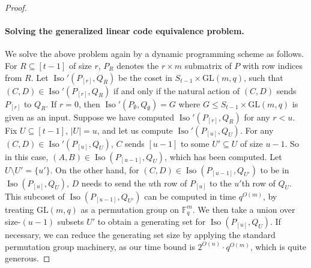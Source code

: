 \documentclass[10pt,a4paper]{article}
\begin{document}
\begin{proof}
\paragraph{Solving the generalized linear code equivalence problem.} We solve the above problem again by a dynamic programming scheme as follows. For $R\subseteq[t-1]$ of size $r$, $P_R$ denotes the $r\times m$ submatrix of $P$ with row indices from $R$. Let $\operatorname{Iso}'(P_{[r]},Q_R)$ be the coset in $S_{t-1}\times\mathrm{GL}(m,q)$, such that $(C,D)\in\operatorname{Iso}'(P_{[r]},Q_R)$ if and only if the natural action of $(C,D)$ sends $P_{[r]}$ to $Q_R$. If $r=0$, then $\operatorname{Iso}'(P_\emptyset,Q_\emptyset)=G$ where $G\le S_{t-1}\times\mathrm{GL}(m,q)$ is given as an input.
Suppose we have computed $\operatorname{Iso}'(P_{[r]},Q_R)$ for any $r<u$. Fix $U\subseteq[t-1]$, $|U|=u$, and let us compute $\operatorname{Iso}'(P_{[u]},Q_U)$. For any $(C,D)\in\operatorname{Iso}'(P_{[u]},Q_U)$, $C$ sends $[u-1]$ to some $U'\subseteq U$ of size $u-1$. So in this case, $(A,B)\in\operatorname{Iso}(P_{[u-1]},Q_U)$, which has been computed. Let $U\setminus U'=\{u'\}$. On the other hand, for $(C,D)\in\operatorname{Iso}(P_{[u-1]},Q_{U'})$ to be in $\operatorname{Iso}(P_{[u]},Q_U)$, $D$ needs to send the $u$th row of $P_{[u]}$ to the $u'$th row of $Q_U$. This subcoset of $\operatorname{Iso}(P_{[u-1]},Q_{U'})$ can be computed in time $q^{O(m)}$, by treating $\mathrm{GL}(m,q)$ as a permutation group on $\mathbb F_q^m$. We then take a union over size-$(u-1)$ subsets $U'$ to obtain a generating set for $\operatorname{Iso}(P_{[u]},Q_U)$. If necessary, we can reduce the generating set size by applying the standard permutation group machinery, as our time bound is $2^{O(n)}\cdot q^{O(m)}$, which is quite generous.
\end{proof}
\end{document}
